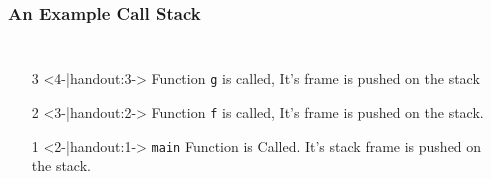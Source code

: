 \documentclass{beamer}
\begin{document}
\begin{frame}[b]
    \frametitle{An Example Call Stack}
    \begin{columns}
        \begin{enumerate}
            \item[3]<4-|handout:3-> Function {\tt g} is called, It's frame is pushed on the stack
            \par\vspace{0.3in}
            \item[2]<3-|handout:2-> Function {\tt f} is called, It's frame is pushed on the stack.
            \par\vspace{0.3in}
            \item[1]<2-|handout:1-> {\tt main} Function is Called.  It's stack frame is pushed on the stack.
            \par\vspace{0.25in}
        \end{enumerate}
            \begin{overlayarea}{\textwidth}{0.9\textheight} 
            \end{overlayarea}
    \end{columns}
\end{frame}
\end{document}
